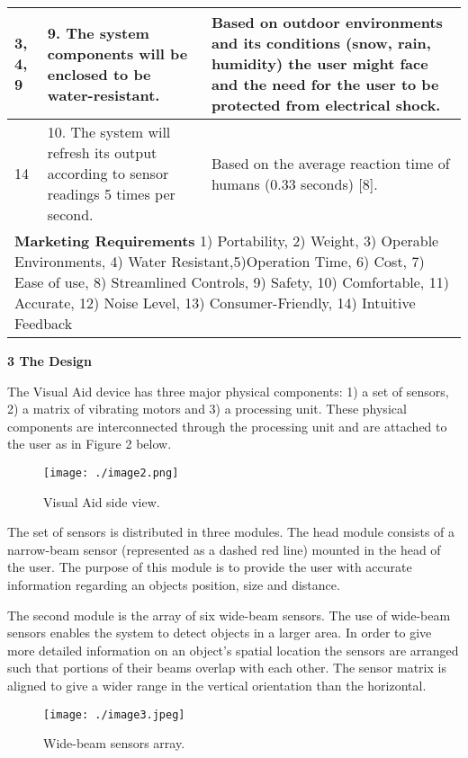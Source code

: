 \begin{table}
\begin{tabular}{|m{3cm}|m{3cm}|m{3cm}|}
3, 4, 9 & 
		9. The system components will be enclosed to be water-resistant.	&
		Based on outdoor environments and its conditions (snow,
		rain, humidity) the user might face and the need for the user to be 
		protected from electrical shock. \\ \hline

14 & 
		10. The system will refresh its output according to sensor readings 5
		  times per second. &
		Based on the average reaction time of humans (0.33 seconds) {[}8{]}. \\ \hline

\multicolumn{3}{l}{
\textbf{Marketing Requirements}
1) Portability, 2) Weight, 3) Operable Environments, 4) Water
Resistant,5)Operation Time, 6) Cost, 7) Ease of use, 8) Streamlined
Controls, 9) Safety, 10) Comfortable, 11) Accurate, 12) Noise Level, 13)
Consumer-Friendly, 14) Intuitive Feedback } \\ \hline

\end{tabular}
\end{table}


\textbf{3 The Design}

The Visual Aid device has three major physical components: 1) a set of
sensors, 2) a matrix of vibrating motors and 3) a processing unit. These
physical components are interconnected through the processing unit and
are attached to the user as in Figure 2 below.


\begin{figure}
\texttt{[image: ./image2.png]}
\caption{Visual Aid side view.}
\label{figure:caseStudySideView}
\end{figure}

The set of sensors is distributed in three modules. The head module
consists of a narrow-beam sensor (represented as a dashed red line)
mounted in the head of the user. The purpose of this module is to
provide the user with accurate information regarding an objects
position, size and distance.

The second module is the array of six wide-beam sensors. The use of
wide-beam sensors enables the system to detect objects in a larger area.
In order to give more detailed information on an object's spatial
location the sensors are arranged such that portions of their beams
overlap with each other. The sensor matrix is aligned to give a wider
range in the vertical orientation than the horizontal.

\begin{figure}
\texttt{[image: ./image3.jpeg]}
\caption{Wide-beam sensors array.}
\label{figure:caseStudyWideBeam}
\end{figure}

